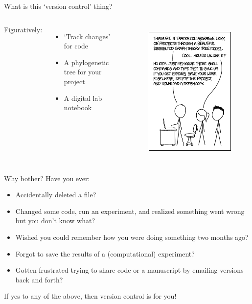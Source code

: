 \documentclass[pdf]{beamer} %
\begin{document}
\begin{frame}[t]{What is this `version control' thing?}
\begin{columns}
    Figuratively:
    \begin{itemize}
        \item `Track changes' for code
        \item A phylogenetic tree for your project
        \item A digital lab notebook
    \end{itemize}
    \begin{figure}[htpb]
        \centering
        \includegraphics[width=0.7\linewidth]{fig/xkcd}
        \label{fig:xkcd}
    \end{figure}
    \end{columns}
\end{frame}

\begin{frame}[t]{Why bother?}
Have you ever:
\begin{itemize}
    \item Accidentally deleted a file?
    \item Changed some code, run an experiment, and realized something went wrong but you don't know what?
    \item Wished you could remember how you were doing something two months ago?
    \item Forgot to save the results of a (computational) experiment?
    \item Gotten frustrated trying to share code or a manuscript by emailing versions back and forth?
\end{itemize}

If yes to any of the above, then version control is for you!
\end{frame}
\end{document}
